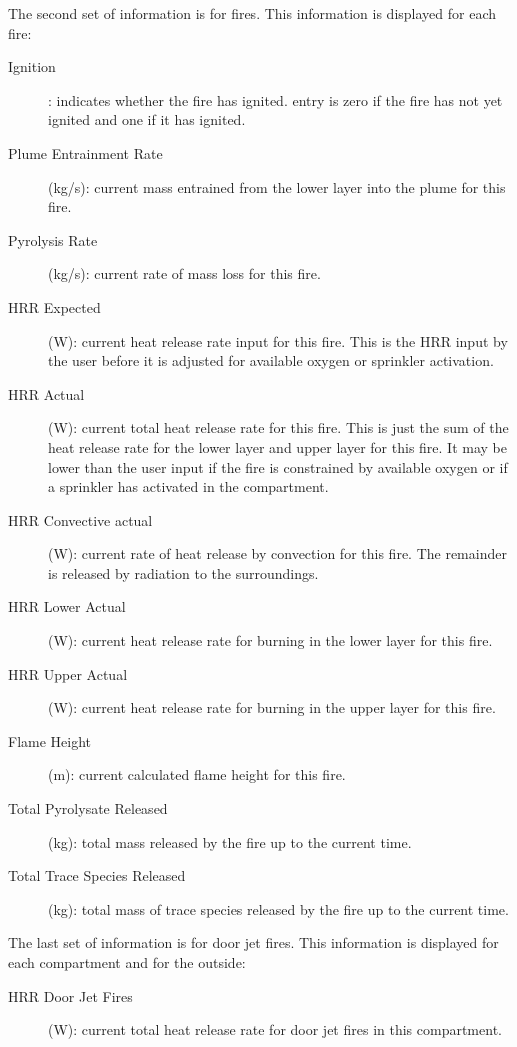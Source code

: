The second set of information is for fires. This information is displayed for each fire:

\begin{description}
\item[Ignition]: indicates whether the fire has ignited. entry is zero if the fire has not yet ignited and one if it has ignited.
\item[Plume Entrainment Rate] (kg/s): current mass entrained from the lower layer into the plume for this fire.
\item[Pyrolysis Rate] (kg/s): current rate of mass loss for this fire.
\item[HRR Expected] (W): current heat release rate input for this fire. This is the HRR input by the user before it is adjusted for available oxygen or sprinkler activation.
\item[HRR Actual] (W): current total heat release rate for this fire. This is just the sum of the heat release rate for the lower layer and upper layer for this fire. It may be lower than the user input if the fire is constrained by available oxygen or if a sprinkler has activated in the compartment.
\item[HRR Convective actual] (W): current rate of heat release by convection for this fire.  The remainder is released by radiation to the surroundings.
\item[HRR Lower Actual] (W): current heat release rate for burning in the lower layer for this fire.
\item[HRR Upper Actual] (W):  current heat release rate for burning in the upper layer for this fire.
\item[Flame Height] (m): current calculated flame height for this fire.
\item[Total Pyrolysate Released] (kg): total mass released by the fire up to the current time.
\item[Total Trace Species Released] (kg): total mass of trace species released by the fire up to the current time.
\end{description}

The last set of information is for door jet fires. This information is displayed for each compartment and for the outside:

\begin{description}
  \item[HRR Door Jet Fires] (W): current total heat release rate for door jet fires in this compartment.
\end{description}


